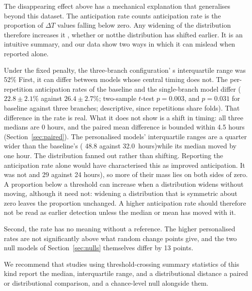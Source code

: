 \documentclass[preprint,12pt,authoryear]{elsarticle}
\newcommand{\dt}{$\Delta T$}
\providecommand{\DIFaddtex}[1]{{\protect\color{blue} \sf #1}} %
\providecommand{\DIFdeltex}[1]{{\protect\color{red} \scriptsize #1}} %
\providecommand{\DIFaddbegin}{} %
\providecommand{\DIFaddend}{} %
\providecommand{\DIFdelbegin}{} %
\providecommand{\DIFdelend}{} %
\providecommand{\DIFadd}[1]{\texorpdfstring{\DIFaddtex{#1}}{#1}} %
\providecommand{\DIFdel}[1]{\texorpdfstring{\DIFdeltex{#1}}{}} %
\newcommand{\DIFscaledelfig}{0.5}
\newlength{\DIFdelgraphicswidth} %
\newlength{\DIFdelgraphicsheight} %
\newcommand{\DIFaddincludegraphics}[2][]{{\color{blue}\fbox{\DIFOincludegraphics[#1]{#2}}}} %
\newcommand{\DIFdelincludegraphics}[2][]{%
\sbox{\DIFdelgraphicsbox}{\DIFOincludegraphics[#1]{#2}}%
\settoboxwidth{\DIFdelgraphicswidth}{\DIFdelgraphicsbox} %
\settoboxtotalheight{\DIFdelgraphicsheight}{\DIFdelgraphicsbox} %
\scalebox{\DIFscaledelfig}{%
\parbox[b]{\DIFdelgraphicswidth}{\usebox{\DIFdelgraphicsbox}\\[-\baselineskip] \rule{\DIFdelgraphicswidth}{0em}}\llap{\resizebox{\DIFdelgraphicswidth}{\DIFdelgraphicsheight}{%
\setlength{\unitlength}{\DIFdelgraphicswidth}%
\begin{picture}(1,1)%
\thicklines\linethickness{2pt} %
{\color[rgb]{1,0,0}\put(0,0){\framebox(1,1){}}}%
{\color[rgb]{1,0,0}\put(0,0){\line( 1,1){1}}}%
{\color[rgb]{1,0,0}\put(0,1){\line(1,-1){1}}}%
\end{picture}%
}\hspace*{3pt}}} %
} %
\DeclareRobustCommand{\DIFaddbegin}{\DIFOaddbegin \let\includegraphics\DIFaddincludegraphics} %
\DeclareRobustCommand{\DIFaddend}{\DIFOaddend \let\includegraphics\DIFOincludegraphics} %
\DeclareRobustCommand{\DIFdelbegin}{\DIFOdelbegin \let\includegraphics\DIFdelincludegraphics} %
\DeclareRobustCommand{\DIFdelend}{\DIFOaddend \let\includegraphics\DIFOincludegraphics} %
\begin{document}
The \DIFdelbegin \DIFdel{disappearing effect above has a mechanical explanation that
generalises beyond this dataset. The anticipation rate counts }\DIFdelend \DIFaddbegin \DIFadd{anticipation rate is }\DIFaddend the proportion of \dt{} values \DIFdelbegin \DIFdel{falling }\DIFdelend below zero. \DIFdelbegin \DIFdel{Any widening of the
distribution therefore increases it , whether or notthe distribution
has shifted earlier. }\DIFdelend \DIFaddbegin \DIFadd{It
is an intuitive summary, and our data show two ways in which it can
mislead when reported alone.
}\DIFaddend 

\DIFdelbegin \DIFdel{Under the fixed penalty, the three-branch configuration' s
interquartile range was 52\% }\DIFdelend \DIFaddbegin \DIFadd{First, it can differ between models whose central timing does not. The
per-repetition anticipation rates of the baseline and the
single-branch model differ ($22.8 \pm 2.1$\% against
$26.4 \pm 2.7$\%; two-sample $t$-test $p = 0.003$, and $p = 0.031$ for
baseline against three branches; descriptive, since repetitions share
folds). That difference in the rate is real. What it does not show is
a shift in timing: all three medians are 0 hours, and the paired mean
difference is bounded within 4.5 hours (Section~\ref{sec:paired}). The
personalised models' interquartile ranges are a quarter }\DIFaddend wider than the
baseline's (\DIFdelbegin \DIFdel{48.8 against 32.0~hours)while its median moved by one hour. The distribution fanned out rather than shifting. Reporting the anticipation rate alone
would have characterised this as
improved anticipation.
It was not }\DIFdelend \DIFaddbegin \DIFadd{30 and 29 against 24 hours), so more of their mass lies on
both sides of zero. A proportion below a threshold can increase when a
distribution widens without moving, although it need not: widening a
distribution that is symmetric about zero leaves the proportion
unchanged. A higher anticipation rate should therefore not be read as
earlier detection unless the median or mean has moved with it.
}

\DIFadd{Second, the rate has no meaning without a reference. The higher
personalised rates are not significantly above what random change
points give, and the two null models of Section~\ref{sec:nulls}
themselves differ by 13 points}\DIFaddend .

We recommend that studies using threshold-crossing summary statistics
of this kind report the median, interquartile range, \DIFdelbegin \DIFdel{and a distributional distance }\DIFdelend \DIFaddbegin \DIFadd{a paired or
distributional comparison, and a chance-level null }\DIFaddend alongside them.
\end{document}
